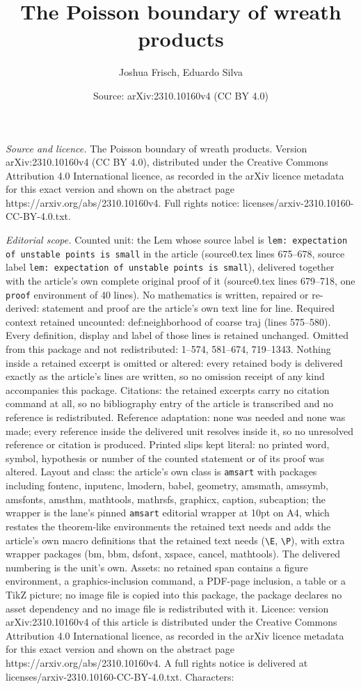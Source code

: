 \documentclass[10pt,a4paper]{amsart}
\title[The Poisson boundary of wreath products]{The Poisson boundary of wreath products}
\author{Joshua Frisch, Eduardo Silva}
\date{Source: arXiv:2310.10160v4 (CC BY 4.0)}
\begin{document}
\maketitle

\noindent\emph{Source and licence.} The Poisson boundary of wreath products. Version arXiv:2310.10160v4 (CC BY 4.0), distributed under the Creative Commons Attribution 4.0 International licence, as recorded in the arXiv licence metadata for this exact version and shown on the abstract page https://arxiv.org/abs/2310.10160v4. Full rights notice: licenses/arxiv-2310.10160-CC-BY-4.0.txt.\par\smallskip

\noindent\textit{Editorial scope.} Counted unit: the Lem whose source label is \texttt{lem: expectation of unstable points is small} in the article (source0.tex lines 675--678, source label \texttt{lem: expectation of unstable points is small}), delivered together with the article's own complete original proof of it (source0.tex lines 679--718, one \texttt{proof} environment of 40 lines). No mathematics is written, repaired or re-derived: statement and proof are the article's own text line for line. Required context retained uncounted: def:neighborhood of coarse traj (lines 575--580). Every definition, display and label of those lines is retained unchanged. Omitted from this package and not redistributed: 1--574, 581--674, 719--1343. Nothing inside a retained excerpt is omitted or altered: every retained body is delivered exactly as the article's lines are written, so no omission receipt of any kind accompanies this package. Citations: the retained excerpts carry no citation command at all, so no bibliography entry of the article is transcribed and no reference is redistributed. Reference adaptation: none was needed and none was made; every reference inside the delivered unit resolves inside it, so no unresolved reference or citation is produced. Printed slips kept literal: no printed word, symbol, hypothesis or number of the counted statement or of its proof was altered. Layout and class: the article's own class is \texttt{amsart} with packages including fontenc, inputenc, lmodern, babel, geometry, amsmath, amssymb, amsfonts, amsthm, mathtools, mathrsfs, graphicx, caption, subcaption; the wrapper is the lane's pinned \texttt{amsart} editorial wrapper at 10pt on A4, which restates the theorem-like environments the retained text needs and adds the article's own macro definitions that the retained text needs (\texttt{\textbackslash E}, \texttt{\textbackslash P}), with extra wrapper packages (bm, bbm, dsfont, xspace, cancel, mathtools). The delivered numbering is the unit's own. Assets: no retained span contains a figure environment, a graphics-inclusion command, a PDF-page inclusion, a table or a TikZ picture; no image file is copied into this package, the package declares no asset dependency and no image file is redistributed with it. Licence: version arXiv:2310.10160v4 of this article is distributed under the Creative Commons Attribution 4.0 International licence, as recorded in the arXiv licence metadata for this exact version and shown on the abstract page https://arxiv.org/abs/2310.10160v4. A full rights notice is delivered at licenses/arxiv-2310.10160-CC-BY-4.0.txt. Characters: 
\end{document}
